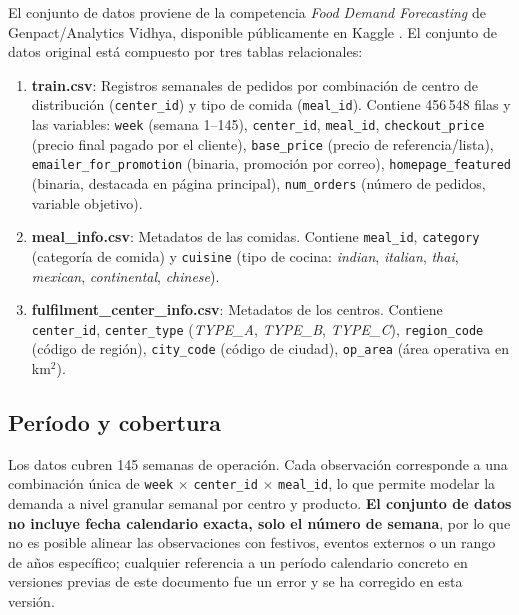 \documentclass[doc, a4paper, biblatex, floatsintext, longtable, babel]{apa7}
\begin{document}
El conjunto de datos proviene de la competencia \textit{Food Demand Forecasting} de Genpact/Analytics Vidhya, disponible p\'ublicamente en Kaggle \parencite{kaggle_food_demand}. El conjunto de datos original est\'a compuesto por tres tablas relacionales:

\begin{enumerate}
    \item \textbf{train.csv}: Registros semanales de pedidos por combinaci\'on de centro de distribuci\'on (\texttt{center\_id}) y tipo de comida (\texttt{meal\_id}). Contiene 456\,548 filas y las variables: \texttt{week} (semana 1--145), \texttt{center\_id}, \texttt{meal\_id}, \texttt{checkout\_price} (precio final pagado por el cliente), \texttt{base\_price} (precio de referencia/lista), \texttt{emailer\_for\_promotion} (binaria, promoci\'on por correo), \texttt{homepage\_featured} (binaria, destacada en p\'agina principal), \texttt{num\_orders} (n\'umero de pedidos, variable objetivo).
    \item \textbf{meal\_info.csv}: Metadatos de las comidas. Contiene \texttt{meal\_id}, \texttt{category} (categor\'ia de comida) y \texttt{cuisine} (tipo de cocina: \textit{indian}, \textit{italian}, \textit{thai}, \textit{mexican}, \textit{continental}, \textit{chinese}).
    \item \textbf{fulfilment\_center\_info.csv}: Metadatos de los centros. Contiene \texttt{center\_id}, \texttt{center\_type} (\textit{TYPE\_A}, \textit{TYPE\_B}, \textit{TYPE\_C}), \texttt{region\_code} (c\'odigo de regi\'on), \texttt{city\_code} (c\'odigo de ciudad), \texttt{op\_area} (\'area operativa en km$^2$).
\end{enumerate}

\subsection{Per\'iodo y cobertura}

Los datos cubren 145 semanas de operaci\'on. Cada observaci\'on corresponde a una combinaci\'on \'unica de \texttt{week} $\times$ \texttt{center\_id} $\times$ \texttt{meal\_id}, lo que permite modelar la demanda a nivel granular semanal por centro y producto. \textbf{El conjunto de datos no incluye fecha calendario exacta, solo el n\'umero de semana}, por lo que no es posible alinear las observaciones con festivos, eventos externos o un rango de a\~nos espec\'ifico; cualquier referencia a un per\'iodo calendario concreto en versiones previas de este documento fue un error y se ha corregido en esta versi\'on.
\end{document}
